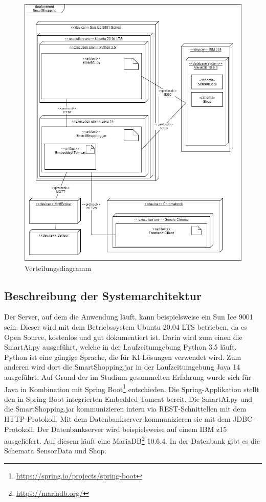 \documentclass[runningheads]{llncs}
\begin{document}
\begin{figure}[H]
	\includegraphics[width=\linewidth]{images/deployment_diagram}
	\caption{Verteilungsdiagramm}
\end{figure}


\subsection{Beschreibung der Systemarchitektur}
Der Server, auf dem die Anwendung läuft, kann beispielsweise ein Sun Ice 9001 sein.
Dieser wird mit dem Betriebssystem Ubuntu 20.04 LTS betrieben, da es Open Source, kostenlos und gut dokumentiert ist.
Darin wird zum einen die SmartAi.py ausgeführt, welche in der Laufzeitumgebung Python 3.5 läuft. 
Python ist eine gängige Sprache, die für KI-Lösungen verwendet wird.
Zum anderen wird dort die SmartShopping.jar in der Laufzeitumgebung Java 14 ausgeführt.
Auf Grund der im Studium gesammelten Erfahrung wurde sich für Java in Kombination mit Spring Boot\footnote{\url{https://spring.io/projects/spring-boot}} entschieden.
Die Spring-Applikation stellt den in Spring Boot integrierten Embedded Tomcat bereit.
Die SmartAi.py und die SmartShopping.jar kommunizieren intern via REST-Schnittellen mit dem HTTP-Protokoll.
Mit dem Datenbankserver kommunizieren sie mit dem JDBC-Protokoll.
Der Datenbankserver wird beispielsweise auf einem IBM z15 ausgeliefert.
Auf diesem läuft eine MariaDB\footnote{\url{https://mariadb.org/}} 10.6.4.
In der Datenbank gibt es die Schemata SensorData und Shop.
\end{document}
